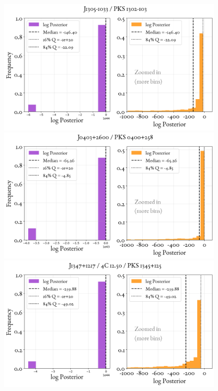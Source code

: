 \begin{figure}
    \centering
    \includegraphics[width=0.8\linewidth]{figures/ResultPosteriors/117_Posterior_6001.png}\\
     \includegraphics[width=0.8\linewidth]{figures/ResultPosteriors/118_Posterior_6600.png}\\ 
     \includegraphics[width=0.8\linewidth]{figures/ResultPosteriors/119_Posterior_8810.png}
\end{figure}




















